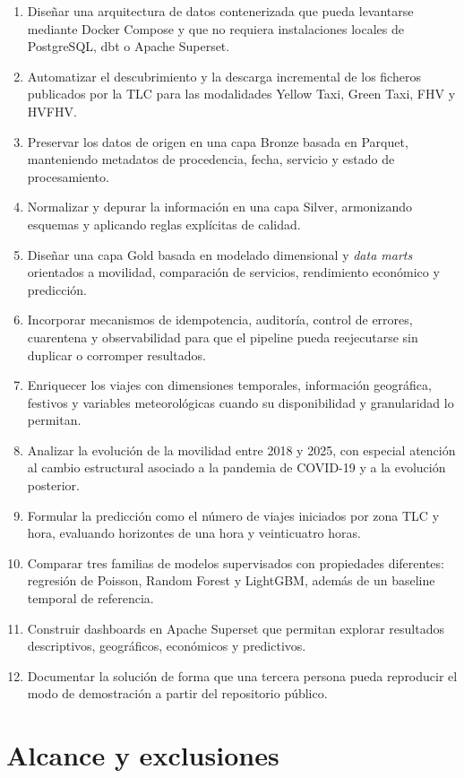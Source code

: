 \begin{enumerate}
    \item Diseñar una arquitectura de datos contenerizada que pueda levantarse mediante Docker Compose y que no requiera instalaciones locales de PostgreSQL, dbt o Apache Superset.
    \item Automatizar el descubrimiento y la descarga incremental de los ficheros publicados por la TLC para las modalidades Yellow Taxi, Green Taxi, FHV y HVFHV\@.
    \item Preservar los datos de origen en una capa Bronze basada en Parquet, manteniendo metadatos de procedencia, fecha, servicio y estado de procesamiento.
    \item Normalizar y depurar la información en una capa Silver, armonizando esquemas y aplicando reglas explícitas de calidad.
    \item Diseñar una capa Gold basada en modelado dimensional y \textit{data marts} orientados a movilidad, comparación de servicios, rendimiento económico y predicción.
    \item Incorporar mecanismos de idempotencia, auditoría, control de errores, cuarentena y observabilidad para que el pipeline pueda reejecutarse sin duplicar o corromper resultados.
    \item Enriquecer los viajes con dimensiones temporales, información geográfica, festivos y variables meteorológicas cuando su disponibilidad y granularidad lo permitan.
    \item Analizar la evolución de la movilidad entre 2018 y 2025, con especial atención al cambio estructural asociado a la pandemia de COVID-19 y a la evolución posterior.
    \item Formular la predicción como el número de viajes iniciados por zona TLC y hora, evaluando horizontes de una hora y veinticuatro horas.
    \item Comparar tres familias de modelos supervisados con propiedades diferentes: regresión de Poisson, Random Forest y LightGBM, además de un baseline temporal de referencia.
    \item Construir dashboards en Apache Superset que permitan explorar resultados descriptivos, geográficos, económicos y predictivos.
    \item Documentar la solución de forma que una tercera persona pueda reproducir el modo de demostración a partir del repositorio público.
\end{enumerate}

\section{Alcance y exclusiones}

